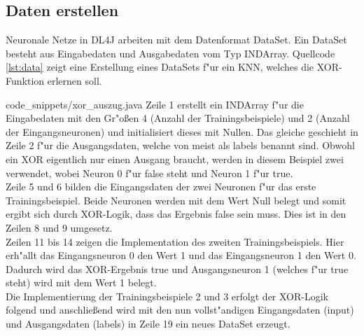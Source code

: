 {\subsection{Daten erstellen}
Neuronale Netze in DL4J arbeiten mit dem Datenformat DataSet. Ein DataSet besteht aus Eingabedaten und Ausgabedaten vom Typ INDArray. Quellcode \ref{lst:data} zeigt eine Erstellung eines DataSets f"ur ein KNN, welches die XOR-Funktion erlernen soll.

{code_snippets/xor_auszug.java}
Zeile 1 erstellt ein INDArray f"ur die Eingabedaten mit den Gr"o{\ss}en 4 (Anzahl der Trainingsbeispiele) und 2 (Anzahl der Eingangsneuronen) und initialisiert dieses mit Nullen. Das gleiche geschieht in Zeile 2 f"ur die Ausgangsdaten, welche von \cite{DL4J} meist als labels benannt sind. Obwohl ein XOR eigentlich nur einen Ausgang braucht, werden in diesem Beispiel zwei verwendet, wobei Neuron 0 f"ur false steht und Neuron 1 f"ur true.\\
Zeile 5 und 6 bilden die Eingangsdaten der zwei Neuronen f"ur das erste Trainingsbeispiel. Beide Neuronen werden mit dem Wert Null belegt und somit ergibt sich durch XOR-Logik, dass das Ergebnis false sein muss. Dies ist in den Zeilen 8 und 9 umgesetz.\\
Zeilen 11 bis 14 zeigen die Implementation des zweiten Trainingsbeispiels. Hier erh"allt das Eingangsneuron 0 den Wert 1 und das Eingangsneuron 1 den Wert 0. Dadurch wird das XOR-Ergebnis true und Ausgangsneuron 1 (welches f"ur true steht) wird mit dem Wert 1 belegt.\\
Die Implementierung der Trainingsbeispiele 2 und 3 erfolgt der XOR-Logik folgend und anschlie{\ss}end wird mit den nun vollst"andigen Eingangsdaten (input) und Ausgangsdaten (labels) in Zeile 19 ein neues DataSet erzeugt.


} %